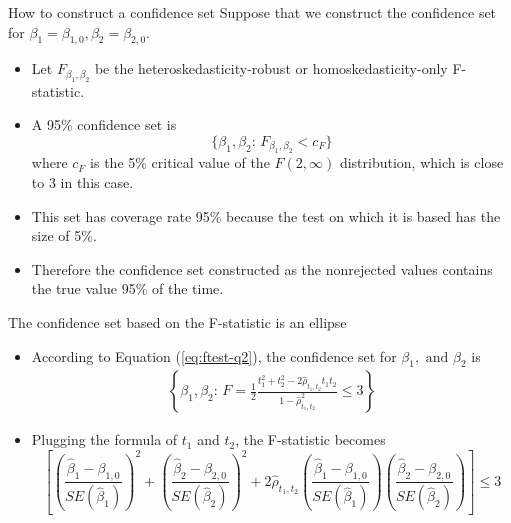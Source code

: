\documentclass[presentation,10pt]{beamer}
\begin{document}
\begin{frame}[label={sec:org54e3ab1}]{How to construct a confidence set}
Suppose that we construct the confidence set for \(\beta_1 =
\beta_{1,0}, \beta_2 = \beta_{2,0}\).

\begin{itemize}
\item Let \(F_{\beta_1, \beta_2}\) be the heteroskedasticity-robust or
homoskedasticity-only F-statistic.

\item A 95\% confidence set is
\[\{\beta_1, \beta_2:\, F_{\beta_1,\beta_2} < c_F\}\]
where \(c_F\) is the 5\% critical value of the \(F(2, \infty)\)
distribution, which is close to 3 in this case.

\item This set has coverage rate 95\% because the test on which it is based
has the size of 5\%.

\item Therefore the confidence set constructed as the nonrejected values
contains the true value 95\% of the time.
\end{itemize}
\end{frame}

\begin{frame}[label={sec:orgcd7a2a8}]{The confidence set based on the F-statistic is an ellipse}
\begin{itemize}
\item According to Equation (\ref{eq:ftest-q2}), the confidence set for \(\beta_1, \text{ and } \beta_2\) is
\begin{gather*}
\left\{ \beta_1, \beta_2:\, F = \frac{1}{2}\frac{t^2_1 + t^2_2 - 2 \hat{\rho}_{t_1,t_2}t_1t_2}{1 - \hat{\rho}_{t_1,t_2}^2} \leq 3 \right\}
\end{gather*}

\item Plugging the formula of \(t_1\) and \(t_2\), the F-statistic becomes
\begin{equation*}
\left[ \left(\frac{\hat{\beta}_1 - \beta_{1,0}}{SE(\hat{\beta}_1)}\right)^2 + \left(\frac{\hat{\beta}_2 - \beta_{2,0}}{SE(\hat{\beta}_2)}\right)^2 + 2 \hat{\rho}_{t_1,t_2}\left(\frac{\hat{\beta}_1 - \beta_{1,0}}{SE(\hat{\beta}_1)}\right) \left(\frac{\hat{\beta}_2 - \beta_{2,0}}{SE(\hat{\beta}_2)}\right) \right] \leq 3
\end{equation*}
\end{itemize}
\end{frame}
\end{document}
